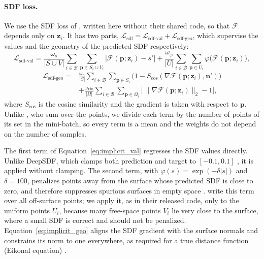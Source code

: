 \paragraph{SDF loss.}                    %
We use the SDF loss of \citet{zhang2024}, written here without their shared code, so that
$\mathcal{F}$ depends only on $\mathbf{z}_i$. It has two parts,
$\mathcal{L}_{\mathrm{sdf}} = \mathcal{L}_{\mathrm{sdf\text{-}val}} +
\mathcal{L}_{\mathrm{sdf\text{-}geo}}$, which supervise the values and the geometry of the
predicted SDF respectively:
\begin{equation}
  \mathcal{L}_{\mathrm{sdf\text{-}val}} =
  \frac{\omega_s}{|S \cup V|} \sum_{i \in \mathcal{B}} \sum_{\mathbf{p} \in S_i \cup V_i}
      \big|\mathcal{F}(\mathbf{p}; \mathbf{z}_i) - s'\big|
  + \frac{\omega_\varphi}{|U|} \sum_{i \in \mathcal{B}} \sum_{\mathbf{p} \in U_i}
      \varphi\big(\mathcal{F}(\mathbf{p}; \mathbf{z}_i)\big),
  \label{eq:implicit_val}                %
\end{equation}
\begin{equation}
  \begin{split}
    \mathcal{L}_{\mathrm{sdf\text{-}geo}} =
    &\frac{\omega_n}{|S|} \sum_{i \in \mathcal{B}} \sum_{\mathbf{p} \in S_i}
        \big(1 - S_{\cos}(\nabla\mathcal{F}(\mathbf{p}; \mathbf{z}_i), \mathbf{n}')\big) \\
    &+ \frac{\omega_{\mathrm{Eik}}}{|\Omega|} \sum_{i \in \mathcal{B}} \sum_{\mathbf{p} \in \Omega_i}
        \big|\,\|\nabla\mathcal{F}(\mathbf{p}; \mathbf{z}_i)\|_2 - 1\big|,
  \end{split}
  \label{eq:implicit_geo}                %
\end{equation}
where $S_{\cos}$ is the cosine similarity and the gradient is taken with respect to
$\mathbf{p}$. Unlike \citet{zhang2024}, who sum over the points, we divide each term by the
number of points of its set in the mini-batch, so every term is a mean and the weights do
not depend on the number of samples.

The first term of Equation~\eqref{eq:implicit_val} regresses the SDF values directly. Unlike
DeepSDF, which clamps both prediction and target to $[-0.1, 0.1]$ \cite{park2019}, it is
applied without clamping. The second term, with $\varphi(s) = \exp(-\delta |s|)$ and
$\delta = 100$, penalizes points away from the surface whose predicted SDF is close to zero,
and therefore suppresses spurious surfaces in empty space \cite{zhang2024}. \citet{zhang2024}
write this term over all off-surface points; we apply it, as in their released code, only to
the uniform points $U_i$, because many free-space points $V_i$ lie very close to the surface,
where a small SDF is correct and should not be penalized. Equation~\eqref{eq:implicit_geo}
aligns the SDF gradient with the surface normals and constrains its norm to one everywhere,
as required for a true distance function (Eikonal equation) \cite{gropp2020,zhang2024}.

